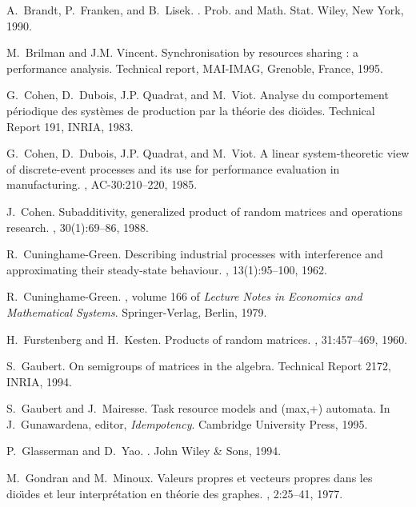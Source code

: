 \documentclass[11pt,titlepage]{article}
\begin{document}
\begin{thebibliography}{10}
A.~Brandt, P.~Franken, and B.~Lisek.
.
\newblock Prob. and Math. Stat. Wiley, New York, 1990.

M.~Brilman and J.M. Vincent.
\newblock Synchronisation by resources sharing : a performance analysis.
\newblock Technical report, MAI-IMAG, Grenoble, France, 1995.

G.~Cohen, D.~Dubois, J.P. Quadrat, and M.~Viot.
\newblock Analyse du comportement p\'{e}riodique des syst\`{e}mes de production
  par la th\'{e}orie des dio\"\i des.
\newblock Technical Report 191, INRIA, 1983.

G.~Cohen, D.~Dubois, J.P. Quadrat, and M.~Viot.
\newblock A linear system-theoretic view of discrete-event processes and its
  use for performance evaluation in manufacturing.
, AC-30:210--220, 1985.

J.~Cohen.
\newblock Subadditivity, generalized product of random matrices and operations
  research.
, 30(1):69--86, 1988.

R.~Cuninghame-Green.
\newblock Describing industrial processes with interference and approximating
  their steady-state behaviour.
, 13(1):95--100, 1962.

R.~Cuninghame-Green.
, volume 166 of {\em Lecture Notes in Economics
  and Mathematical Systems}.
\newblock Springer-Verlag, Berlin, 1979.

H.~Furstenberg and H.~Kesten.
\newblock Products of random matrices.
, 31:457--469, 1960.

S.~Gaubert.
\newblock On semigroups of matrices in the  algebra.
\newblock Technical Report 2172, INRIA, 1994.

S.~Gaubert and J.~Mairesse.
\newblock Task resource models and (max,+) automata.
\newblock In J.~Gunawardena, editor, {\em Idempotency}. Cambridge University
  Press, 1995.

P.~Glasserman and D.~Yao.
.
\newblock John Wiley \& Sons, 1994.

M.~Gondran and M.~Minoux.
\newblock Valeurs propres et vecteurs propres dans les dio\"\i des et leur
  interpr\'etation en th\'eorie des graphes.
, 2:25--41, 1977.


\end{thebibliography}
\end{document}
